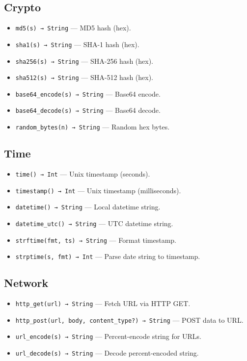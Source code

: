 \subsection{Crypto}
\begin{itemize}
    \item \texttt{md5(s) → String} — MD5 hash (hex).
    \item \texttt{sha1(s) → String} — SHA-1 hash (hex).
    \item \texttt{sha256(s) → String} — SHA-256 hash (hex).
    \item \texttt{sha512(s) → String} — SHA-512 hash (hex).
    \item \texttt{base64\_encode(s) → String} — Base64 encode.
    \item \texttt{base64\_decode(s) → String} — Base64 decode.
    \item \texttt{random\_bytes(n) → String} — Random hex bytes.
\end{itemize}

\subsection{Time}
\begin{itemize}
    \item \texttt{time() → Int} — Unix timestamp (seconds).
    \item \texttt{timestamp() → Int} — Unix timestamp (milliseconds).
    \item \texttt{datetime() → String} — Local datetime string.
    \item \texttt{datetime\_utc() → String} — UTC datetime string.
    \item \texttt{strftime(fmt, ts) → String} — Format timestamp.
    \item \texttt{strptime(s, fmt) → Int} — Parse date string to timestamp.
\end{itemize}

\subsection{Network}
\begin{itemize}
    \item \texttt{http\_get(url) → String} — Fetch URL via HTTP GET.
    \item \texttt{http\_post(url, body, content\_type?) → String} — POST data to URL.
    \item \texttt{url\_encode(s) → String} — Percent-encode string for URLs.
    \item \texttt{url\_decode(s) → String} — Decode percent-encoded string.
\end{itemize}

